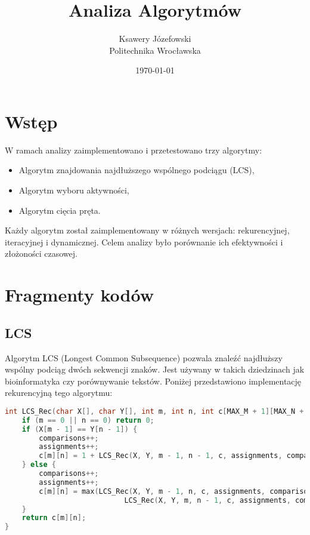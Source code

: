 \documentclass[a4paper,12pt]{article}
\title{Analiza Algorytmów}
\author{Ksawery Józefowski\\Politechnika Wrocławska}
\date{\today}
\begin{document}
\maketitle

\tableofcontents
\newpage

\section{Wstęp}
W ramach analizy zaimplementowano i przetestowano trzy algorytmy: 
\begin{itemize}
    \item Algorytm znajdowania najdłuższego wspólnego podciągu (LCS),
    \item Algorytm wyboru aktywności,
    \item Algorytm cięcia pręta.
\end{itemize}
Każdy algorytm został zaimplementowany w różnych wersjach: rekurencyjnej, iteracyjnej i dynamicznej. Celem analizy było porównanie ich efektywności i złożoności czasowej.

\section{Fragmenty kodów}
\subsection{LCS}
Algorytm LCS (Longest Common Subsequence) pozwala znaleźć najdłuższy wspólny podciąg dwóch sekwencji znaków. Jest używany w takich dziedzinach jak bioinformatyka czy porównywanie tekstów. Poniżej przedstawiono implementację rekurencyjną tego algorytmu:
\begin{lstlisting}[language=C++]
int LCS_Rec(char X[], char Y[], int m, int n, int c[MAX_M + 1][MAX_N + 1]) {
    if (m == 0 || n == 0) return 0;
    if (X[m - 1] == Y[n - 1]) {
        comparisons++;
        assignments++;
        c[m][n] = 1 + LCS_Rec(X, Y, m - 1, n - 1, c, assignments, comparisons);
    } else {
        comparisons++;
        assignments++;
        c[m][n] = max(LCS_Rec(X, Y, m - 1, n, c, assignments, comparisons),
                            LCS_Rec(X, Y, m, n - 1, c, assignments, comparisons));
    }
    return c[m][n];
}
\end{lstlisting}
\end{document}
